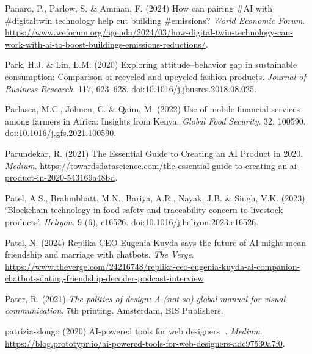 \documentclass[
  letterpaper,
  DIV=11,
  numbers=noendperiod]{scrartcl}
\newlength{\cslhangindent}
\newenvironment{CSLReferences}[2] %
 {\begin{list}{}{%
  \setlength{\itemindent}{0pt}
  \setlength{\leftmargin}{0pt}
  \setlength{\parsep}{0pt}
  \ifodd #1
   \setlength{\leftmargin}{\cslhangindent}
   \setlength{\itemindent}{-1\cslhangindent}
  \fi
  \setlength{\itemsep}{#2\baselineskip}}}
 {\end{list}}
\begin{document}
\begin{CSLReferences}{0}{1}
Panaro, P., Parlow, S. \& Amman, F. (2024) How can pairing \#{AI} with
\#digitaltwin technology help cut building \#emissions? \emph{World
Economic Forum}.
\url{https://www.weforum.org/agenda/2024/03/how-digital-twin-technology-can-work-with-ai-to-boost-buildings-emissions-reductions/}.

Park, H.J. \& Lin, L.M. (2020) Exploring attitude--behavior gap in
sustainable consumption: Comparison of recycled and upcycled fashion
products. \emph{Journal of Business Research}. 117, 623--628.
doi:\href{https://doi.org/10.1016/j.jbusres.2018.08.025}{10.1016/j.jbusres.2018.08.025}.

Parlasca, M.C., Johnen, C. \& Qaim, M. (2022) Use of mobile financial
services among farmers in {Africa}: {Insights} from {Kenya}.
\emph{Global Food Security}. 32, 100590.
doi:\href{https://doi.org/10.1016/j.gfs.2021.100590}{10.1016/j.gfs.2021.100590}.

Parundekar, R. (2021) The {Essential Guide} to {Creating} an {AI
Product} in 2020. \emph{Medium}.
\url{https://towardsdatascience.com/the-essential-guide-to-creating-an-ai-product-in-2020-543169a48bd}.

Patel, A.S., Brahmbhatt, M.N., Bariya, A.R., Nayak, J.B. \& Singh, V.K.
(2023) {`{Blockchain} technology in food safety and traceability concern
to livestock products'}. \emph{Heliyon}. 9 (6), e16526.
doi:\href{https://doi.org/10.1016/j.heliyon.2023.e16526}{10.1016/j.heliyon.2023.e16526}.

Patel, N. (2024) Replika {CEO Eugenia Kuyda} says the future of {AI}
might mean friendship and marriage with chatbots. \emph{The Verge}.
\url{https://www.theverge.com/24216748/replika-ceo-eugenia-kuyda-ai-companion-chatbots-dating-friendship-decoder-podcast-interview}.

Pater, R. (2021) \emph{The politics of design: A (not so) global manual
for visual communication}. 7th printing. Amsterdam, BIS Publishers.

patrizia-slongo (2020) {AI-powered} tools for web designers 🤖.
\emph{Medium}.
\url{https://blog.prototypr.io/ai-powered-tools-for-web-designers-adc97530a7f0}.


\end{CSLReferences}
\end{document}
